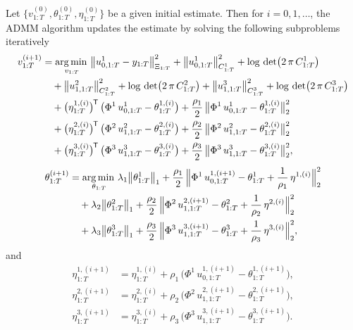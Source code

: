 \begin{algorithm}
	\label{alg:admm}
	Let $\big\lbrace v^{(0)}_{1:T}, \theta^{(0)}_{1:T}, \eta^{(0)}_{1:T}\big\rbrace$ be a given initial estimate. Then for $i=0,1,\ldots$, the ADMM algorithm updates the estimate by solving the following subproblems iteratively
	\begin{align}
		v^{(i+1)}_{1:T} &= \operatorname*{arg\,min\,}_{v_{1:T}} \big \lVert u^1_{0, 1:T} - y_{1:T} \big \rVert^2_{\Xi_{1:T}} + \big \lVert u^1_{0, 1:T} \big \rVert^2_{C^1_{1:T}} + \log \,\det\bigl(2 \, \pi \, C^1_{1:T}\bigr) \nonumber\\
		&\quad+ \big \lVert u^2_{1, 1:T} \big \rVert^2_{C^2_{1:T}} + \log \,\det\bigl(2 \, \pi \, C^2_{1:T}\bigr) + \big \lVert u^3_{1, 1:T} \big \rVert^2_{C^3_{1:T}} + \log \,\det\bigl(2 \, \pi \, C^3_{1:T}\bigr) \nonumber\\
		&\quad+ \big(\eta^{1, (i)}_{1:T}\big)^{\mkern-1.5mu\mathsf{T}} \, \big(\Phi^1 \, u^1_{0,1:T} - \theta^{1, (i)}_{1:T}\big) + \frac{\rho_1}{2}  \, \big \lVert \Phi^1 \, u^1_{0,1:T} - \theta^{1, (i)}_{1:T} \big \rVert^2_2 \label{equ:r-dgp-sub-f}\\
		&\quad+ \big(\eta^{2, (i)}_{1:T}\big)^{\mkern-1.5mu\mathsf{T}} \, \big(\Phi^2 \, u^2_{1,1:T} - \theta^{2, (i)}_{1:T}\big) + \frac{\rho_2}{2}  \, \big \lVert \Phi^2 \, u^2_{1,1:T} - \theta^{2, (i)}_{1:T} \big \rVert^2_2 \nonumber\\
		&\quad+ \big(\eta^{3, (i)}_{1:T}\big)^{\mkern-1.5mu\mathsf{T}} \, \big(\Phi^3 \, u^3_{1,1:T} - \theta^{3, (i)}_{1:T}\big) + \frac{\rho_3}{2} \,  \big \lVert \Phi^3 \, u^3_{1,1:T} - \theta^{3, (i)}_{1:T} \big \rVert^2_2, \nonumber
	\end{align}
	\begin{equation}
		\begin{split}
			\theta^{(i+1)}_{1:T} &= \operatorname*{arg\,min\,}_{\theta_{1:T}} \lambda_1 \big \lVert \theta^1_{1:T} \big \rVert_1 + \frac{\rho_1}{2}  \, \Big \lVert \Phi^1 \, u^{1, (i+1)}_{0,1:T} - \theta^1_{1:T} + \frac{1}{\rho_1}\,\eta^{1, (i)} \Big\rVert_2^2\\
			&\quad+ \lambda_2 \big \lVert \theta^2_{1:T} \big \rVert_1 + \frac{\rho_2}{2} \,  \Big \lVert \Phi^2 \, u^{2, (i+1)}_{1,1:T} - \theta^2_{1:T} + \frac{1}{\rho_2}\,\eta^{2, (i)} \Big\rVert_2^2\\
			&\quad+ \lambda_3 \big \lVert \theta^3_{1:T} \big \rVert_1 + \frac{\rho_3}{2} \,  \Big \lVert \Phi^3 \, u^{3, (i+1)}_{1,1:T} - \theta^3_{1:T} + \frac{1}{\rho_3}\,\eta^{3, (i)} \Big\rVert_2^2,
			\label{equ:r-dgp-sub-theta}
		\end{split}
	\end{equation}
	and
	\begin{equation}
		\begin{split}
			\eta^{1, (i+1)}_{1:T} &= \eta^{1, (i)}_{1:T} + \rho_1\, \big( \Phi^1 \, u^{1, (i+1)}_{0,1:T} - \theta^{1, (i+1)}_{1:T} \big), \\
			\eta^{2, (i+1)}_{1:T} &= \eta^{2, (i)}_{1:T} + \rho_2\, \big( \Phi^2 \, u^{2, (i+1)}_{1,1:T} - \theta^{2, (i+1)}_{1:T} \big), \\
			\eta^{3, (i+1)}_{1:T} &= \eta^{3, (i)}_{1:T} + \rho_3\, \big( \Phi^3 \, u^{3, (i+1)}_{1,1:T} - \theta^{3, (i+1)}_{1:T} \big). 
		\end{split}
	\end{equation}
\end{algorithm}

